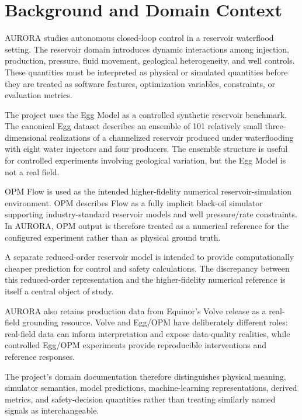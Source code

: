 \section{Background and Domain Context}
\label{sec:background}

AURORA studies autonomous closed-loop control in a reservoir waterflood setting.
The reservoir domain introduces dynamic interactions among injection, production,
pressure, fluid movement, geological heterogeneity, and well controls. These
quantities must be interpreted as physical or simulated quantities before they are
treated as software features, optimization variables, constraints, or evaluation
metrics.

The project uses the Egg Model as a controlled synthetic reservoir benchmark.
The canonical Egg dataset describes an ensemble of 101 relatively small
three-dimensional realizations of a channelized reservoir produced under
waterflooding with eight water injectors and four producers. The ensemble structure
is useful for controlled experiments involving geological variation, but the Egg
Model is not a real field.

OPM Flow is used as the intended higher-fidelity numerical reservoir-simulation
environment. OPM describes Flow as a fully implicit black-oil simulator supporting
industry-standard reservoir models and well pressure/rate constraints. In AURORA,
OPM output is therefore treated as a numerical reference for the configured
experiment rather than as physical ground truth.

A separate reduced-order reservoir model is intended to provide computationally
cheaper prediction for control and safety calculations. The discrepancy between this
reduced-order representation and the higher-fidelity numerical reference is itself a
central object of study.

AURORA also retains production data from Equinor's Volve release as a real-field
grounding resource. Volve and Egg/OPM have deliberately different roles: real-field
data can inform interpretation and expose data-quality realities, while controlled
Egg/OPM experiments provide reproducible interventions and reference responses.

The project's domain documentation therefore distinguishes physical meaning,
simulator semantics, model predictions, machine-learning representations, derived
metrics, and safety-decision quantities rather than treating similarly named signals
as interchangeable.
